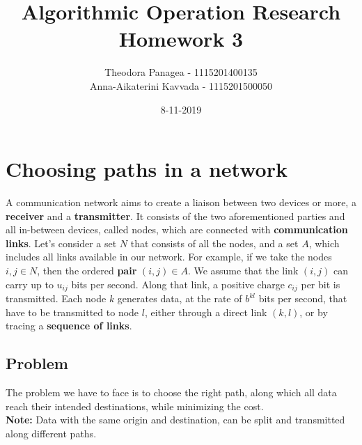 \documentclass[12pt]{article}
\title{Algorithmic Operation Research \\ Homework 3}
\date{8-11-2019}
\author{Theodora Panagea - 1115201400135 \\ Anna-Aikaterini Kavvada - 1115201500050}
\begin{document}
	\maketitle{}
  	\newpage
  	
\section{Choosing paths in a network}
A communication network aims to create a liaison between two devices or more, a \textbf{receiver} and a \textbf{transmitter}. It consists of the two aforementioned parties and all in-between devices, called nodes, which are connected with \textbf{communication links}. Let's consider a set $N$ that consists of all the nodes, and a set $A$, which includes all links available in our network. For example, if we take the nodes $i,j \in N$, then the ordered \textbf{pair} $(i,j) \in A$. We assume that the link $(i,j)$ can carry up to $u_{ij}$ bits per second. Along that link, a positive charge $c_{ij}$ per bit is transmitted. Each node $k$ generates data, at the rate of $b^{kl}$ bits per second, that have to be transmitted to node $l$, either through a direct link $(k,l)$, or by tracing a \textbf{sequence of links}.  

\subsection*{Problem}
The problem we have to face is to choose the right path, along which all data reach their intended destinations, while minimizing the cost. \\
\textbf{Note:} Data with the same origin and destination, can be split and transmitted along different paths. \par
\end{document}
